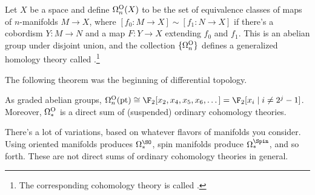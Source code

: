 \begin{exm}[Bordism]
Let $X$ be a space and define $\Omega_n^\mathrm O(X)$ to be the set of equivalence classes of maps of $n$-manifolds $M\to
X$, where $[f_0\colon M\to X]\sim [f_1\colon N\to X]$ if there's a cobordism $Y\colon M\to N$ and a map $F\colon
Y\to X$ extending $f_0$ and $f_1$. This is an abelian group under disjoint union, and the collection
$\{\Omega_n^\mathrm O\}$ defines a generalized homology theory called .\footnote{The
corresponding cohomology theory is called .}

The following theorem was the beginning of differential topology.
\begin{thm}[Thom]
As graded abelian groups, $\Omega_n^\O(\pt)\cong\F_2[x_2,x_4,x_5,x_6,\dotsc] = \F_2[x_i\mid i\ne 2^j-1]$. Moreover,
$\Omega_*^\mathrm O$ is a direct sum of (suspended) ordinary cohomology theories.
\end{thm}
There's a lot of variations, based on whatever flavors of manifolds you consider. Using oriented manifolds produces
 $\Omega_*^\SO$, spin manifolds produce  $\Omega_*^\Spin$, and so forth.
These are not direct sums of ordinary cohomology theories in general.
\end{exm}




